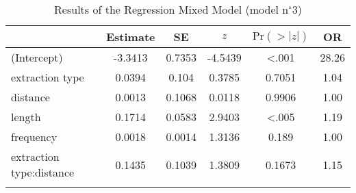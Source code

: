 \begin{table}
\begin{tabular}{l S[table-format=-1.4] S[table-format=1.4] S[table-format=-1.4] S[table-format=<1.4] S[table-format=2.2]}
  \lsptoprule
 & {Estimate} & {SE} & {$z$} & {$\text{Pr}(>|z|)$} & {OR} \\ 
  \midrule
(Intercept) & -3.3413 & 0.7353 & -4.5439 & <.001 & 28.26 \\ 
  extraction type & 0.0394 & 0.104 & 0.3785 & 0.7051 & 1.04 \\ 
  distance & 0.0013 & 0.1068 & 0.0118 & 0.9906 & 1.00 \\ 
  length & 0.1714 & 0.0583 & 2.9403 & <.005 & 1.19 \\ 
  frequency & 0.0018 & 0.0014 & 1.3136 & 0.189 & 1.00 \\ 
  extraction type:distance & 0.1435 & 0.1039 & 1.3809 & 0.1673 & 1.15 \\ 
   \lspbottomrule
\end{tabular}
\caption{Results of the Regression Mixed Model (model n$^{\circ}$3)}
\label{tab:exp03-m3}
\end{table}
